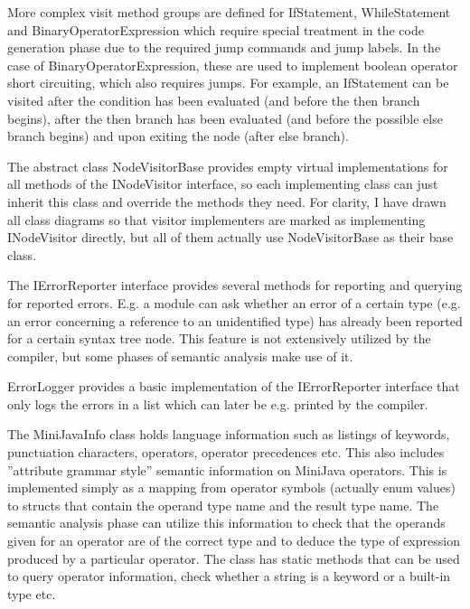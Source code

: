 \documentclass[a4paper,11pt]{article}
\begin{document}
More complex visit method groups are defined for IfStatement, WhileStatement and BinaryOperatorExpression which require special treatment in the code generation phase due to the required jump commands and jump labels. In the case of BinaryOperatorExpression, these are used to implement boolean operator short circuiting, which also requires jumps. For example, an IfStatement can be visited after the condition has been evaluated (and before the then branch begins), after the then branch has been evaluated (and before the possible else branch begins) and upon exiting the node (after else branch).

The abstract class NodeVisitorBase provides empty virtual implementations for all methods of the INodeVisitor interface, so each implementing class can just inherit this class and override the methods they need. For clarity, I have drawn all class diagrams so that visitor implementers are marked as implementing INodeVisitor directly, but all of them actually use NodeVisitorBase as their base class.

The IErrorReporter interface provides several methods for reporting and querying for reported errors. E.g. a module can ask whether an error of a certain type (e.g. an error concerning a reference to an unidentified type) has already been reported for a certain syntax tree node. This feature is not extensively utilized by the compiler, but some phases of semantic analysis make use of it.

ErrorLogger provides a basic implementation of the IErrorReporter interface that only logs the errors in a list which can later be e.g. printed by the compiler.

The MiniJavaInfo class holds language information such as listings of keywords, punctuation characters, operators, operator precedences etc. This also includes ''attribute grammar style'' semantic information on MiniJava operators. This is implemented simply as a mapping from operator symbols (actually enum values) to structs that contain the operand type name and the result type name. The semantic analysis phase can utilize this information to check that the operands given for an operator are of the correct type and to deduce the type of expression produced by a particular operator. The class has static methods that can be used to query operator information, check whether a string is a keyword or a built-in type etc.
\end{document}

